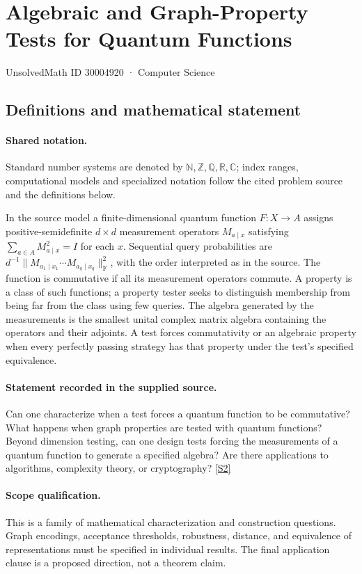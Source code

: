 \documentclass[11pt]{article}
\newcommand{\sref}[2]{\hyperlink{source:#1:#2}{[S#2]}}
\begin{document}
\setcounter{section}{30004919}
\section{Algebraic and Graph-Property Tests for Quantum Functions}\label{30004920}
{\small\sffamily UnsolvedMath ID 30004920 · Computer Science}
\subsection{Definitions and mathematical statement}

\paragraph{Shared notation.}Standard number systems are denoted by $\mathbb N,\mathbb Z,\mathbb Q,\mathbb R,\mathbb C$; index ranges, computational models and specialized notation follow the cited problem source and the definitions below.


In the source model a finite-dimensional quantum function $F:X\to A$ assigns positive-semidefinite $d\times d$ measurement operators $M_{a\mid x}$ satisfying $\sum_{a\in A}M_{a\mid x}^2=I$ for each $x$. Sequential query probabilities are $d^{-1}\|M_{a_1\mid x_1}\cdots M_{a_q\mid x_q}\|_{\mathrm F}^2$, with the order interpreted as in the source. The function is commutative if all its measurement operators commute. A property is a class of such functions; a property tester seeks to distinguish membership from being far from the class using few queries. The algebra generated by the measurements is the smallest unital complex matrix algebra containing the operators and their adjoints. A test forces commutativity or an algebraic property when every perfectly passing strategy has that property under the test's specified equivalence.
\paragraph{Statement recorded in the supplied source.}
Can one characterize when a test forces a quantum function to be commutative? What happens when graph properties are tested with quantum functions? Beyond dimension testing, can one design tests forcing the measurements of a quantum function to generate a specified algebra? Are there applications to algorithms, complexity theory, or cryptography? \sref{30004920}{2}
\paragraph{Scope qualification.}
This is a family of mathematical characterization and construction questions. Graph encodings, acceptance thresholds, robustness, distance, and equivalence of representations must be specified in individual results. The final application clause is a proposed direction, not a theorem claim.
\end{document}
